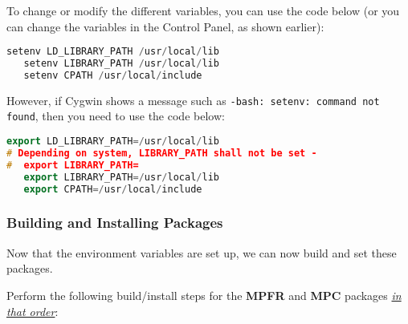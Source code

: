 To change or modify the different variables, you can use the code below (or you can change the variables in the Control Panel, as shown earlier): 
\begin{center}\begin{minipage}{0.9\linewidth}

\begin{lstlisting}[language=c++, caption=Adapted from \cite{installnewerGCC}, captionpos=b]
   setenv LD_LIBRARY_PATH /usr/local/lib
   setenv LIBRARY_PATH /usr/local/lib
   setenv CPATH /usr/local/include
\end{lstlisting}
\end{minipage}\end{center}

However, if Cygwin shows a message such as \texttt{-bash: setenv: command not found}, then you need to use the code below: 
\begin{center}\begin{minipage}{0.9\linewidth}

\begin{lstlisting}[language=c++, caption=Adapted from \cite{installnewerGCC}, captionpos=b]
   export LD_LIBRARY_PATH=/usr/local/lib
# Depending on system, LIBRARY_PATH shall not be set - 
#  export LIBRARY_PATH=
   export LIBRARY_PATH=/usr/local/lib
   export CPATH=/usr/local/include
\end{lstlisting}
\end{minipage}\end{center}










	\subsubsection{Building and Installing Packages}
Now that the environment variables are set up, we can now build and set these packages. 

Perform the following build/install steps for the \textbf{MPFR} and \textbf{MPC} packages \textit{\underline{in that order}}:

